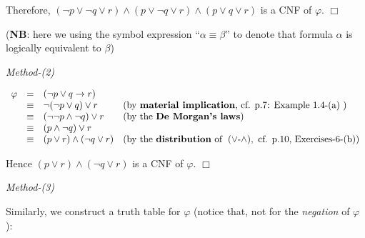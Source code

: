 \documentclass[UTF8,12pt,a4paper]{ctexart}
\begin{document}
Therefore, $ ( \neg p \lor \neg q \lor  r) \land  ( p \lor \neg q \lor r) \land  ( p \lor  q \lor r) $ is a CNF of $\varphi$.
\hfill $\Box$

(\textbf{NB}: here we using the symbol expression “$\alpha \equiv \beta$” \; to denote that formula $\alpha$ is logically equivalent to $\beta$)



\vspace{1em}
\noindent\textit{Method-(2)}

\[\begin{array}{l l l l}
	\varphi 
	&=& 
	(\neg p \lor q \to r) \\
	
	&\equiv&
	\neg ( \neg p \lor q) \lor r  & \text{(by \textbf{material implication},}   \text{ cf. p.7: Example 1.4-(a) )}\\
	
	&\equiv&
	(\neg \neg p \land \neg q) \lor r & \text{(by the \textbf{De Morgan’s laws})}  \\
	
	&\equiv&
	( p \land \neg q) \lor r   \\
	
	&\equiv&
	(p \lor r) \land (\neg q \lor r) & (\text{by the \textbf{distribution} of \;} (\lor\text{-}\land), 
	\text{ cf. p.10, Exercises-6-(b)} )\\ 
\end{array}\]

Hence $(p \lor r) \land (\neg q \lor r)$ is a CNF of $\varphi$.
\hfill $\Box$



\vspace{1em}

\noindent\textit{Method-(3)}

Similarly, we construct a truth table for $\varphi$ (notice that, not for the \textit{negation} of $\varphi$):
\end{document}
